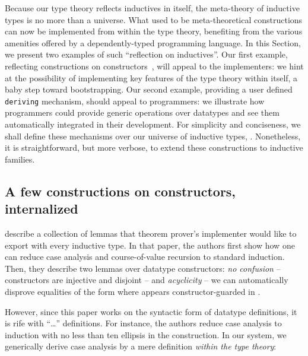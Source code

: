 \documentclass{scrartcl}
\theoremstyle{plain}
\theoremstyle{definition}
\begin{document}
Because our type theory reflects inductives in itself, the meta-theory
of inductive types is no more than a universe. What used to be
meta-theoretical constructions can now be implemented from within the
type theory, benefiting from the various amenities offered by a
dependently-typed programming language. In this Section, we present
two examples of such ``reflection on inductives''. Our first example,
reflecting constructions on
constructors~\citep{mcbride:construction-constructor}, will appeal to
the implementers: we hint at the possibility of implementing key
features of the type theory within itself, a baby step toward
bootstrapping. Our second example, providing a user defined
\texttt{deriving} mechanism, should appeal to programmers: we
illustrate how programmers could provide generic operations over
datatypes and see them automatically integrated in their development.
For simplicity and conciseness, we shall define these mechanisms over
our universe of inductive types, . Nonetheless, it is
straightforward, but more verbose, to extend these constructions to
inductive families.



\subsection{A few constructions on constructors, internalized}
\label{sec:const-on-const}

\citet{mcbride:construction-constructor} describe a collection of
lemmas that theorem prover's implementer would like to export with
every inductive type. In that paper, the authors first show how one
can reduce case analysis and course-of-value recursion to standard
induction. Then, they describe two lemmas over datatype constructors:
\emph{no confusion} -- constructors are injective and disjoint -- and
\emph{acyclicity} -- we can automatically disprove equalities of the
form  where  appears constructor-guarded in .


However, since this paper works on the syntactic form of datatype
definitions, it is rife with ``\ldots'' definitions. For instance, the
authors reduce case analysis to induction with no less than ten
ellipsis in the construction. In our system, we generically derive
case analysis by a mere definition \emph{within the type theory}:


\end{document}
